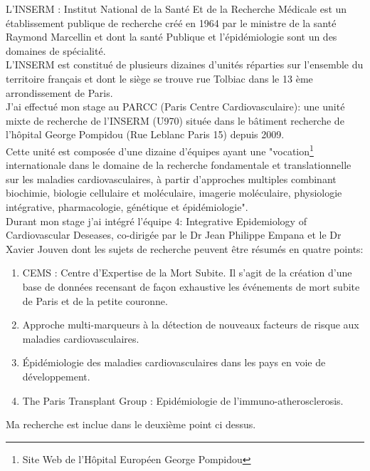 \documentclass{book}
\begin{document}
\noindent
L'INSERM : Institut National de la Santé Et de la Recherche Médicale est un établissement publique de recherche créé en 1964 par le ministre de la santé Raymond Marcellin et dont la santé Publique et l'épidémiologie sont un des domaines de spécialité.\\
L'INSERM est constitué de plusieurs dizaines d'unités réparties sur l'ensemble du territoire français et dont le siège se trouve rue Tolbiac dans le 13 ème arrondissement de Paris.\\
J'ai effectué mon stage au PARCC (Paris Centre Cardiovasculaire): une unité mixte de recherche de l'INSERM (U970) située dans le bâtiment recherche de l'hôpital George Pompidou (Rue Leblanc Paris 15) depuis 2009.\\
Cette unité est composée d'une dizaine d'équipes ayant une "vocation\footnote{Site Web de l'Hôpital Européen George Pompidou} internationale dans le domaine de la recherche fondamentale et translationnelle sur les maladies cardiovasculaires, à partir d'approches multiples combinant biochimie, biologie cellulaire et moléculaire, imagerie moléculaire, physiologie intégrative, pharmacologie, génétique et épidémiologie".\\

\noindent
Durant mon stage j'ai intégré l'équipe 4: Integrative Epidemiology of Cardiovascular Deseases, co-dirigée par le Dr Jean Philippe Empana et le Dr Xavier Jouven dont les sujets de recherche peuvent être résumés en quatre points:
\noindent
\begin{enumerate}
\item CEMS : Centre d'Expertise de la Mort Subite. Il s'agit de la création d'une base de données recensant de façon exhaustive les événements de mort subite de Paris et de la petite couronne.\\
\item Approche multi-marqueurs à la détection de nouveaux facteurs de risque aux maladies cardiovasculaires.\\
\item Épidémiologie des maladies cardiovasculaires dans les pays en voie de développement.\\
\item The Paris Transplant Group : Epidémiologie de l'immuno-atherosclerosis.\\
\end{enumerate}

Ma recherche est inclue dans le deuxième point ci dessus.\\
\end{document}
